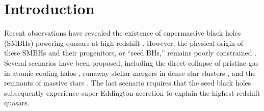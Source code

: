 \documentclass[twocolumn]{aastex631}
\begin{document}


\section{Introduction} \label{sec:intro}

Recent observations have revealed the existence of supermassive black holes (SMBHs) powering quasars at high redshift \citep{WangYangFan_2021ApJ...907L...1W,KokorevCaputiGreene_2024ApJ...968...38K,TripodiMartisMarkov_2025NatCo..16.9830T}. However, the physical origin of these SMBHs and their progenitors, or ``seed BHs,'' remains poorly constrained \citep{InayoshiVisbalHaiman_2020ARA&A..58...27I,VolonteriHabouzitColpi_2021NatRP...3..732V}. Several scenarios have been proposed, including the direct collapse of pristine gas in atomic-cooling halos \citep{BrommLoeb_2003ApJ...596...34B,VolonteriRees_2005ApJ...633..624V,BegelmanVolonteriRees_2006MNRAS.370..289B,ChonHosokawaOmukai_2021MNRAS.502..700C}, runaway stellar mergers in dense star clusters \citep{PortegiesZwartBaumgardtHut_2004Natur.428..724P,GurkanFreitagRasio_2004ApJ...604..632G,ShiGrudicHopkins_2021MNRAS.505.2753S}, and the remnants of massive stars \citep{JohnsonBromm_2007MNRAS.374.1557J,TanakaHaiman_2009ApJ...696.1798T,ChonOmukai_2020MNRAS.494.2851C}. The last scenario requires that the seed black holes subsequently experience super-Eddington accretion to explain the highest redshift quasars.
\end{document}
